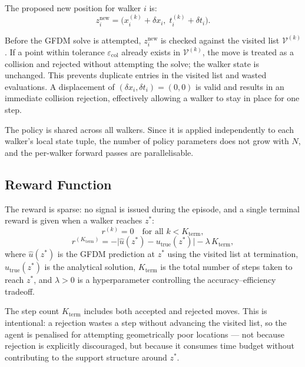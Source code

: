 \documentclass[12pt, a4paper, twoside]{report}
\theoremstyle{plain}
\theoremstyle{definition}
\begin{document}
The proposed new position for walker $i$ is:
\begin{equation}
    z_i^{\mathrm{new}} = \bigl(x_i^{(k)} + \delta x_i,\; t_i^{(k)} + \delta t_i\bigr).
\end{equation}

Before the GFDM solve is attempted, $z_i^{\mathrm{new}}$ is checked against the visited
list $\mathcal{V}^{(k)}$. If a point within tolerance $\varepsilon_{\mathrm{col}}$
already exists in $\mathcal{V}^{(k)}$, the move is treated as a collision and rejected
without attempting the solve; the walker state is unchanged. This prevents duplicate
entries in the visited list and wasted evaluations. A displacement of $(\delta x_i, \delta
t_i) = (0, 0)$ is valid and results in an immediate collision rejection, effectively
allowing a walker to stay in place for one step.

The policy is shared across all walkers. Since it is applied independently to each
walker's local state tuple, the number of policy parameters does not grow with $N$, and
the per-walker forward passes are parallelisable.

\subsection{Reward Function}
 
The reward is sparse: no signal is issued during the episode, and a single terminal reward
is given when a walker reaches $z^*$:
\begin{equation}
    r^{(k)} = 0 \quad \text{for all } k < K_{\mathrm{term}},
    \label{eq:dense_reward}
\end{equation}
\begin{equation}
    r^{(K_{\mathrm{term}})} = -\bigl|\hat{u}(z^*) - u_{\mathrm{true}}(z^*)\bigr|
                               - \lambda \, K_{\mathrm{term}},
    \label{eq:terminal_reward}
\end{equation}
where $\hat{u}(z^*)$ is the GFDM prediction at $z^*$ using the visited list at
termination, $u_{\mathrm{true}}(z^*)$ is the analytical solution, $K_{\mathrm{term}}$
is the total number of steps taken to reach $z^*$, and $\lambda > 0$ is a
hyperparameter controlling the accuracy--efficiency tradeoff.
 
The step count $K_{\mathrm{term}}$ includes both accepted and rejected moves. This is
intentional: a rejection wastes a step without advancing the visited list, so the agent
is penalised for attempting geometrically poor locations --- not because rejection is
explicitly discouraged, but because it consumes time budget without contributing to
the support structure around $z^*$.
 
\end{document}
